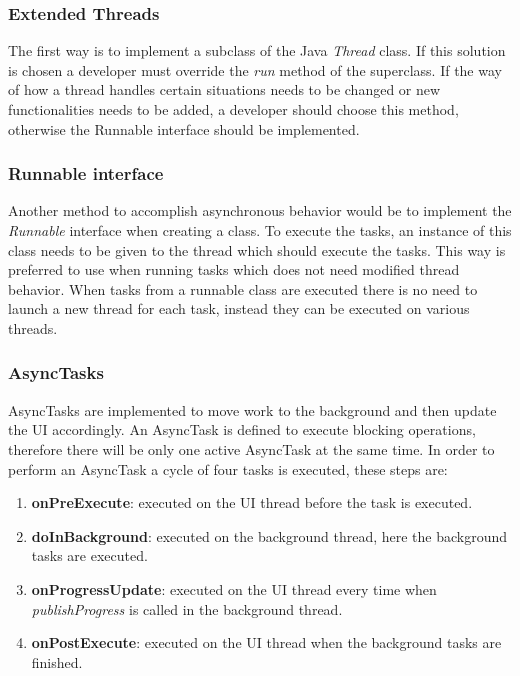     \subsubsection{Extended Threads}
    The first way is to implement a subclass of the Java \emph{Thread} class. If this solution is chosen a developer must override the \emph{run} method of the superclass. If the way of how a thread handles certain situations needs to be changed or new functionalities needs to be added, a developer should choose this method, otherwise the Runnable interface should be implemented.

    \subsubsection{Runnable interface}
    Another method to accomplish asynchronous behavior would be to implement the \emph{Runnable} interface when creating a class. To execute the tasks, an instance of this class needs to be given to the thread which should execute the tasks. This way is preferred to use when running tasks which does not need modified thread behavior. When tasks from a runnable class are executed there is no need to launch a new thread for each task, instead they can be executed on various threads.

    \subsubsection{AsyncTasks}
    AsyncTasks are implemented to move work to the background and then update the UI accordingly. An AsyncTask is defined to execute blocking operations, therefore there will be only one active AsyncTask at the same time. In order to perform an AsyncTask a cycle of four tasks is executed, these steps are:

    \begin{enumerate}
        \item \textbf{onPreExecute}: executed on the UI thread before the task is executed.
        \item \textbf{doInBackground}: executed on the background thread, here the background tasks are executed.
        \item \textbf{onProgressUpdate}: executed on the UI thread every time when \emph{publishProgress} is called in the background thread.
        \item \textbf{onPostExecute}: executed on the UI thread when the background tasks are finished.
    \end{enumerate}

